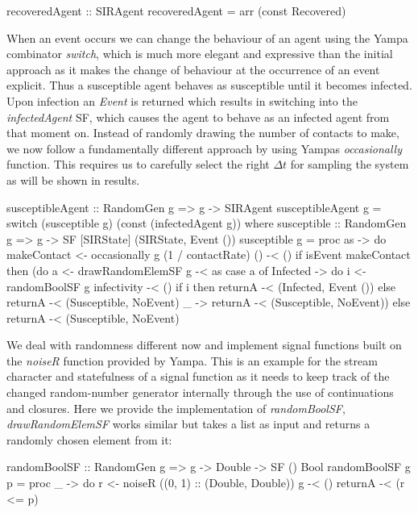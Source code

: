 \begin{HaskellCode}
recoveredAgent :: SIRAgent
recoveredAgent = arr (const Recovered)
\end{HaskellCode}

When an event occurs we can change the behaviour of an agent using the Yampa combinator \textit{switch}, which is much more elegant and expressive than the initial approach as it makes the change of behaviour at the occurrence of an event explicit. Thus a susceptible agent behaves as susceptible until it becomes infected. Upon infection an \textit{Event} is returned which results in switching into the \textit{infectedAgent} SF, which causes the agent to behave as an infected agent from that moment on. Instead of randomly drawing the number of contacts to make, we now follow a fundamentally different approach by using Yampas \textit{occasionally} function. This requires us to carefully select the right $\Delta t$ for sampling the system as will be shown in results. 

\begin{HaskellCode}
susceptibleAgent :: RandomGen g => g -> SIRAgent
susceptibleAgent g = 
    switch (susceptible g) (const (infectedAgent g))
  where
    susceptible :: RandomGen g 
      => g -> SF [SIRState] (SIRState, Event ())
    susceptible g = proc as -> do
      makeContact <- occasionally g (1 / contactRate) () -< ()
      if isEvent makeContact
        then (do
          a <- drawRandomElemSF g -< as
          case a of
            Infected -> do
              i <- randomBoolSF g infectivity -< ()
              if i
                then returnA -< (Infected, Event ())
                else returnA -< (Susceptible, NoEvent)
             _       -> returnA -< (Susceptible, NoEvent))
        else returnA -< (Susceptible, NoEvent)
\end{HaskellCode}

We deal with randomness different now and implement signal functions built on the \textit{noiseR} function provided by Yampa. This is an example for the stream character and statefulness of a signal function as it needs to keep track of the changed random-number generator internally through the use of continuations and closures. Here we provide the implementation of \textit{randomBoolSF}, \textit{drawRandomElemSF} works similar but takes a list as input and returns a randomly chosen element from it:

\begin{HaskellCode}
randomBoolSF :: RandomGen g => g -> Double -> SF () Bool
randomBoolSF g p = proc _ -> do
  r <- noiseR ((0, 1) :: (Double, Double)) g -< ()
  returnA -< (r <= p)
\end{HaskellCode}

